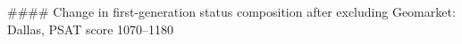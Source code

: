 #### Change in first-generation status composition after excluding Geomarket: Dallas, PSAT score 1070–1180
